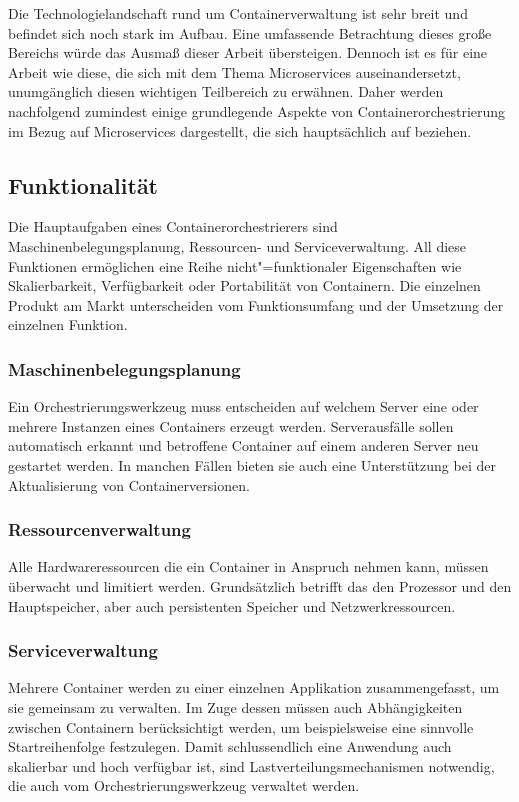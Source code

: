 Die Technologielandschaft rund um Containerverwaltung ist sehr breit und befindet sich noch stark im Aufbau. Eine umfassende Betrachtung dieses große Bereichs würde das Ausmaß dieser Arbeit übersteigen. Dennoch ist es für eine Arbeit wie diese, die sich mit dem Thema Microservices auseinandersetzt, unumgänglich diesen wichtigen Teilbereich zu erwähnen. Daher werden nachfolgend zumindest einige grundlegende Aspekte von Containerorchestrierung im Bezug auf Microservices dargestellt, die sich hauptsächlich auf \cite{ContainerOrcaWars} beziehen. 

\subsection{Funktionalität}

Die Hauptaufgaben eines Containerorchestrierers sind Maschinenbelegungsplanung, Ressourcen- und Serviceverwaltung. All diese Funktionen ermöglichen eine Reihe nicht"=funktionaler Eigenschaften wie Skalierbarkeit, Verfügbarkeit oder Portabilität von Containern. Die einzelnen Produkt am Markt unterscheiden vom Funktionsumfang und der Umsetzung der einzelnen Funktion.

\subsubsection{Maschinenbelegungsplanung}

Ein Orchestrierungswerkzeug muss entscheiden auf welchem Server eine oder mehrere Instanzen eines Containers erzeugt werden. Serverausfälle sollen automatisch erkannt und betroffene Container auf einem anderen Server neu gestartet werden. In manchen Fällen bieten sie auch eine Unterstützung bei der Aktualisierung von Containerversionen.

\subsubsection{Ressourcenverwaltung}

Alle Hardwareressourcen die ein Container in Anspruch nehmen kann, müssen überwacht und limitiert werden. Grundsätzlich betrifft das den Prozessor und den Hauptspeicher, aber auch persistenten Speicher und Netzwerkressourcen.

\subsubsection{Serviceverwaltung}

Mehrere Container werden zu einer einzelnen Applikation zusammengefasst, um sie gemeinsam zu verwalten. Im Zuge dessen müssen auch Abhängigkeiten zwischen Containern berücksichtigt werden, um beispielsweise eine sinnvolle Startreihenfolge festzulegen. Damit schlussendlich eine Anwendung auch skalierbar und hoch verfügbar ist, sind Lastverteilungsmechanismen notwendig, die auch vom Orchestrierungswerkzeug verwaltet werden.

